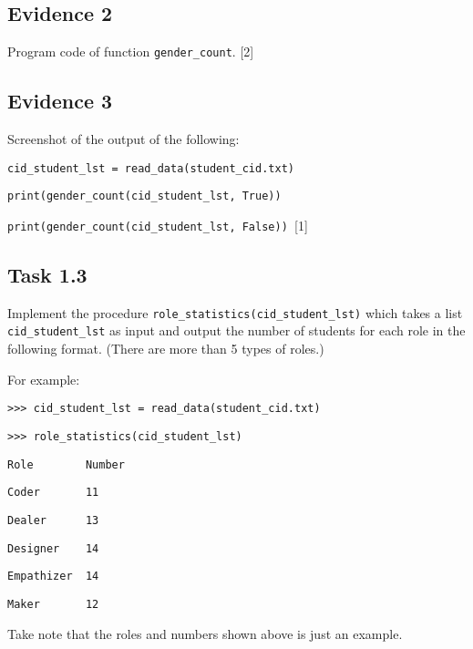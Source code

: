 \subsection*{Evidence 2 }

Program code of function \texttt{gender\_count}.\hfill{} {[}2{]}

\subsection*{Evidence 3 }

Screenshot of the output of the following: 

\noindent %
\noindent\begin{minipage}[t]{1\columnwidth}%
\texttt{cid\_student\_lst = read\_data(\textquotedbl student\_cid.txt\textquotedbl ) }

\texttt{print(gender\_count(cid\_student\_lst, True)) }

\texttt{print(gender\_count(cid\_student\_lst, False))}\hfill{}\texttt{
}{[}1{]}%
\end{minipage}

\subsection*{Task 1.3 }

Implement the procedure \texttt{role\_statistics(cid\_student\_lst)}
which takes a list \texttt{cid\_student\_lst} as input and output
the number of students for each role in the following format. (There
are more than 5 types of roles.) 

For example: 

\noindent %
\noindent\begin{minipage}[t]{1\columnwidth}%
\texttt{>\textcompwordmark >\textcompwordmark > cid\_student\_lst
= read\_data(\textquotedbl student\_cid.txt\textquotedbl ) }

\texttt{>\textcompwordmark >\textcompwordmark > role\_statistics(cid\_student\_lst) }

\texttt{Role ~~~~~~~Number }

\texttt{Coder ~~~~~~11 }

\texttt{Dealer ~~~~~13 }

\texttt{Designer ~~~14 }

\texttt{Empathizer ~14 }

\texttt{Maker ~~~~~~12 }%
\end{minipage}

Take note that the roles and numbers shown above is just an example.

